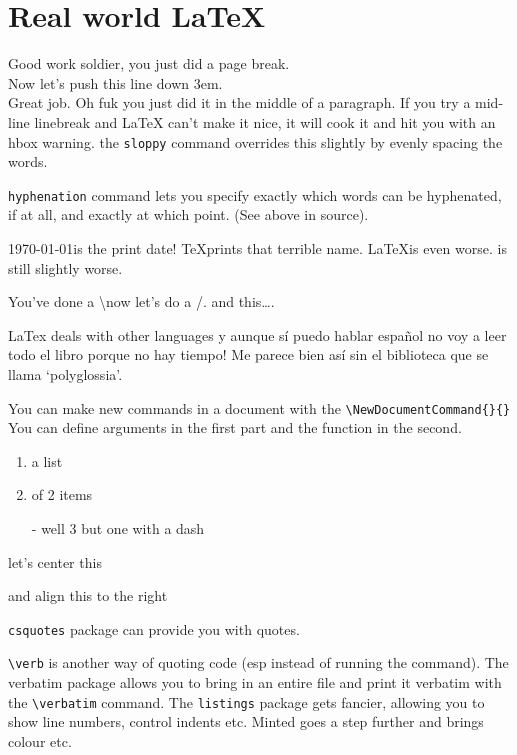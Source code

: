 \documentclass{article}
\begin{document}
\pagebreak

\section{Real world LaTeX}

Good work soldier, you just did a page break. \\[3em] Now let's push this line down 3em.\\Great job. Oh fuk you just did it in the middle of a paragraph. If you try a mid-line linebreak and LaTeX can't make it nice, it will cook it and hit you with an hbox warning. the \texttt{sloppy} command overrides this slightly by evenly spacing the words.


\texttt{hyphenation} command lets you specify exactly which words can be hyphenated, if at all, and exactly at which point. (See above in source).

\today\space is the print date! \TeX\space prints that terrible name. \LaTeX is even worse. \LaTeXe is still slightly worse.

You've done a \textbackslash\space now let's do a \slash. and this\ldots.

LaTex deals with other languages y aunque sí puedo hablar español no voy a leer todo el libro porque no hay tiempo! Me parece bien así sin el biblioteca que se llama `polyglossia'.

You can make new commands in a document with the \texttt{\textbackslash NewDocumentCommand\{\}\{\}} You can define arguments in the first part and the function in the second.

\begin{enumerate}
\item a list
\item of 2 items
\item[-] well 3 but one with a dash
\end{enumerate}

\begin{center} let's center this \end{center}
\begin{flushright} and align this to the right \end{flushright}

\texttt{csquotes} package can provide you with quotes.

\verb|\verb| is another way of quoting code (esp instead of running the command). The verbatim package allows you to bring in an entire file and print it verbatim with the \verb|\verbatim| command. The \verb|listings| package gets fancier, allowing you to show line numbers, control indents etc. Minted goes a step further and brings colour etc.
\end{document}

